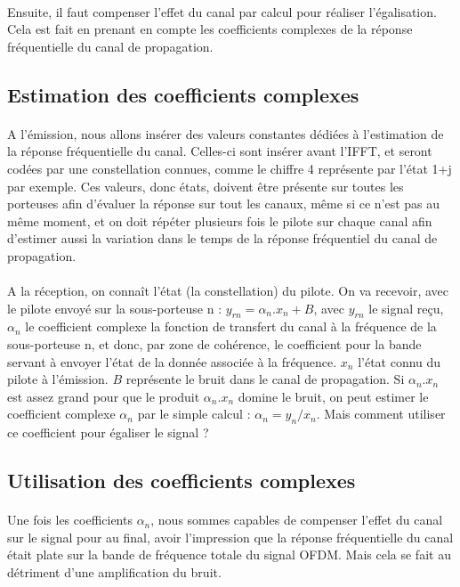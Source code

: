 \paragraph{}
Ensuite, il faut compenser l'effet du canal par calcul pour réaliser l'égalisation. Cela est fait en prenant en compte les coefficients complexes de la réponse fréquentielle du canal de propagation.

\subsection{Estimation des coefficients complexes}
\paragraph{}
A l'émission, nous allons insérer des valeurs constantes dédiées à l'estimation de la réponse fréquentielle du canal. Celles-ci sont insérer avant l'IFFT, et seront codées par une constellation connues, comme le chiffre 4 représente par l'état 1+j par exemple. Ces valeurs, donc états, doivent être présente sur toutes les porteuses afin d'évaluer la réponse sur tout les canaux, même si ce n'est pas au même moment, et on doit répéter plusieurs fois le pilote sur chaque canal afin d'estimer aussi la variation dans le temps de la réponse fréquentiel du canal de propagation.

\paragraph{}
A la réception, on connaît l'état (la constellation) du pilote. On va recevoir, avec le pilote envoyé sur la sous-porteuse n : $y_{rn}=\alpha_n.x_n+B$, avec $y_{rn}$ le signal reçu, $\alpha_n$ le coefficient complexe la fonction de transfert du canal à la fréquence de la sous-porteuse n, et donc, par zone de cohérence, le coefficient pour la bande servant à envoyer l'état de la donnée associée à la fréquence. $x_n$ l'état connu du pilote à l'émission. $B$ représente le bruit dans le canal de propagation. Si $\alpha_n.x_n$ est assez grand pour que le produit $\alpha_n.x_n$ domine le bruit, on peut estimer le coefficient complexe $\alpha_n$ par le simple calcul : $\alpha_n=y_n/x_n$. Mais comment utiliser ce coefficient pour égaliser le signal ?

\subsection{Utilisation des coefficients complexes}
\paragraph{}
Une fois les coefficients $\alpha_n$, nous sommes capables de compenser l'effet du canal sur le signal pour au final, avoir l'impression que la réponse fréquentielle du canal était plate sur la bande de fréquence totale du signal OFDM. Mais cela se fait au détriment d'une amplification du bruit.
